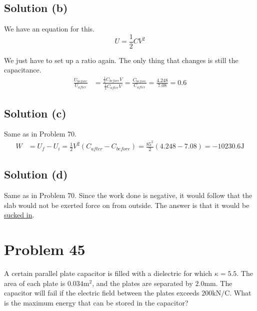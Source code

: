 \documentclass[12pt]{article}
\begin{document}
\subsection*{Solution (b)}
We have an equation for this. 
\begin{equation*}
    U = \frac{1}{2}CV^2
\end{equation*}

We just have to set up a ratio again.
The only thing that changes is still the capacitance.
\begin{align*}
    \frac{U_{before}}{U_{after}}    &=  \frac{\frac{1}{2}C_{before}V}{\frac{1}{2}C_{after}V}
        =   \frac{C_{before}}{C_{after}}
        =   \frac{4.248}{7.08}
        =   \boxed{0.6}
\end{align*}

\subsection*{Solution (c)}
Same as in Problem 70.
\begin{align*}
    W   &=  U_f - U_i
        =   \frac{1}{2}V^2(C_{after} - C_{before})
        =   \frac{85^2}{2}(4.248 - 7.08)
        =   \boxed{-10230.6 \unit{\joule}}
\end{align*}

\subsection*{Solution (d)}
Same as in Problem 70. 
Since the work done is negative, it would follow that the slab would not be exerted force on from outside. 
The answer is that it would be \underline{sucked in}.
\section*{Problem 45}
A certain parallel plate capacitor is filled with a dielectric for which $\kappa = 5.5$. 
The area of each plate is $0.034 \unit{\meter^2}$, and the plates are separated by $2.0 \unit{\milli\meter}$. 
The capacitor will fail if the electric field between the plates exceeds $200\unit{\kilo\newton/\coulomb}$. 
What is the maximum energy that can be stored in the capacitor?
\end{document}
